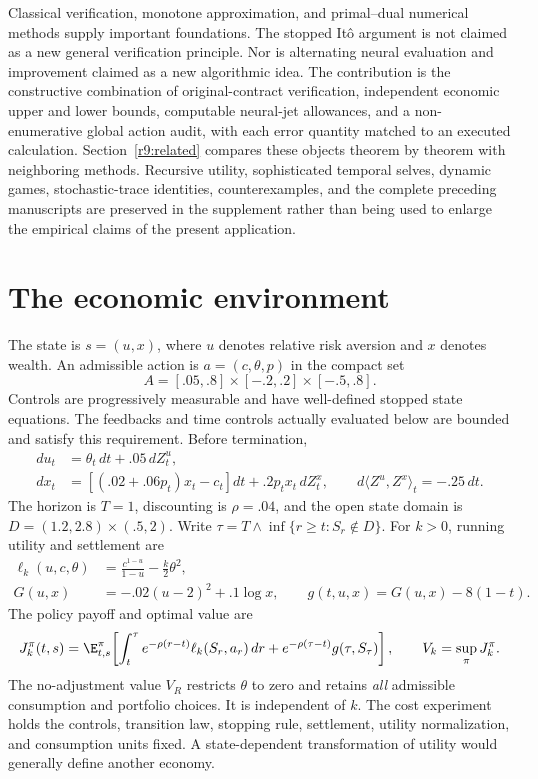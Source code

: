 Classical verification, monotone approximation, and primal--dual numerical methods supply important foundations. The stopped It\^o argument is not claimed as a new general verification principle. Nor is alternating neural evaluation and improvement claimed as a new algorithmic idea. The contribution is the constructive combination of original-contract verification, independent economic upper and lower bounds, computable neural-jet allowances, and a non-enumerative global action audit, with each error quantity matched to an executed calculation. Section~\ref{r9:related} compares these objects theorem by theorem with neighboring methods. Recursive utility, sophisticated temporal selves, dynamic games, stochastic-trace identities, counterexamples, and the complete preceding manuscripts are preserved in the supplement rather than being used to enlarge the empirical claims of the present application.

\section{The economic environment}\label{r9:economy}
The state is $s=(u,x)$, where $u$ denotes relative risk aversion and $x$ denotes wealth. An admissible action is $a=(c,\theta,p)$ in the compact set
\[
 A=[.05,.8]\times[-.2,.2]\times[-.5,.8].
\]
Controls are progressively measurable and have well-defined stopped state equations. The feedbacks and time controls actually evaluated below are bounded and satisfy this requirement. Before termination,
\begin{align}
 du_t&=\theta_t\,dt+.05\,dZ^u_t,\\
 dx_t&=[(.02+.06p_t)x_t-c_t]dt+.2p_tx_t\,dZ^x_t,
 \qquad d\langle Z^u,Z^x\rangle_t=-.25\,dt.\label{r9:dynamics}
\end{align}
The horizon is $T=1$, discounting is $\rho=.04$, and the open state domain is
$D=(1.2,2.8)\times(.5,2)$. Write $\tau=T\wedge\inf\{r\geq t:S_r\notin D\}$. For $k>0$, running utility and settlement are
\begin{align}
 \ell_k(u,c,\theta)&=\frac{c^{1-u}}{1-u}-\frac{k}{2}\theta^2,\\
 G(u,x)&=-.02(u-2)^2+.1\log x,
 \qquad g(t,u,x)=G(u,x)-8(1-t).\label{r9:payoff}
\end{align}
The policy payoff and optimal value are
\begin{equation}
 J_k^\pi(t,s)=\E^\pi_{t,s}\!\left[\int_t^\tau e^{-\rho(r-t)}\ell_k(S_r,a_r)\,dr
        +e^{-\rho(\tau-t)}g(\tau,S_\tau)\right],
 \qquad V_k=\sup_\pi J_k^\pi.\label{r9:objective}
\end{equation}
The no-adjustment value $V_R$ restricts $\theta$ to zero and retains \emph{all} admissible consumption and portfolio choices. It is independent of $k$. The cost experiment holds the controls, transition law, stopping rule, settlement, utility normalization, and consumption units fixed. A state-dependent transformation of utility would generally define another economy.

